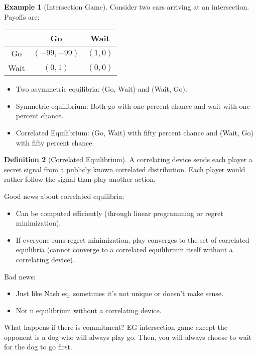 \documentclass[dvipsnames]{article}
\theoremstyle{definition}
\newtheorem{definition}{Definition}[section]
\newtheorem{example}[definition]{Example}
\theoremstyle{remark}
\begin{document}
\begin{example}[Intersection Game]
	Consider two cars arriving at an intersection. Payoffs are:
	\begin{table}[h]\centering
		\begin{tabular}{c|c|c|}
			& Go & Wait \\ \hline
			Go & $(-99,-99)$ & $(1,0)$  \\ \hline
			Wait & $(0,1)$ & $(0,0)$ \\ \hline
		\end{tabular}
	\end{table}
\begin{itemize}
		\item Two asymmetric equilibria: (Go, Wait) and (Wait, Go).
		\item Symmetric equilibrium: Both go with one percent chance and wait with one percent chance. 
		\item Correlated Equilibrium: (Go, Wait) with fifty percent chance and (Wait, Go) with fifty percent chance.
\end{itemize}
\end{example}

\begin{definition}[Correlated Equilibrium]
	A correlating device sends each player a secret signal from a publicly known correlated distribution. Each player would rather follow the signal than play another action. 
\end{definition}

Good news about correlated equilibria: 
\begin{itemize}
	\item Can be computed efficiently (through linear programming or regret minimization).
	\item If everyone runs regret minimization, play converges to the set of correlated equilibria (cannot converge to a correlated equilibrium itself without a correlating device).
\end{itemize}

Bad news:
\begin{itemize}
	\item Just like Nash eq, sometimes it's not unique or doesn't make sense.
	\item Not n equilibrium without a correlating device. 
\end{itemize}

What happens if there is commitment? EG intersection game except the opponent is a dog who will always play go. Then, you will always choose to wait for the dog to go first.
\end{document}
